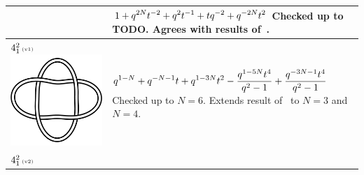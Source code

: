 \documentclass{compositio}
\theoremstyle{definition}
\numberwithin{equation}{section}
\begin{document}
{\begin{longtable}{p{}|p{}}
& 
$
\displaystyle{%
1 + q^{2 N} t^{-2} + q^2 t^{-1} + t q^{-2} + q^{-2 N} t^2
}
$
\newline\newline\newline\newline
Checked up to TODO. Agrees with results of~\cite{r0508510, r0607544}. 
\\
\hline
$4_{1}^2\,\text{{\tiny (v1)}}$ 
\includegraphics[scale=0.07,angle=0]{link4_1_2.pdf} 
& 
$
\displaystyle{%
q^{1-N}+q^{-N-1} t+q^{1-3 N} t^2-\frac{q^{1-5N} t^4}{q^2-1}+\frac{q^{-3 N-1} t^4}{q^2-1}
}
$
\newline\newline\newline\newline
Checked up to $N=6$. Extends result of~\cite{r0508510} to $N=3$ and $N=4$. 
\\
\hline
$4_{1}^2\,\text{{\tiny (v2)}}$ 

\end{longtable}}
\end{document}
